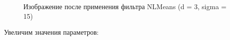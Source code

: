 \documentclass[14pt,a4paper,report]{report}
\begin{document}
\begin{figure}[h]
\begin{minipage}[h]{0.47\linewidth}
\end{minipage}
\caption{Изображение после применения фильтра NLMeans (d = 3, sigma = 15)}
\label{ris:image1}
\end{figure}

Увеличим значения параметров:

\begin{figure}[h]
\begin{minipage}[h]{0.47\linewidth}
\end{minipage}
\hfill
\begin{minipage}[h]{0.47\linewidth}

\end{minipage}
\end{figure}
\end{document}
